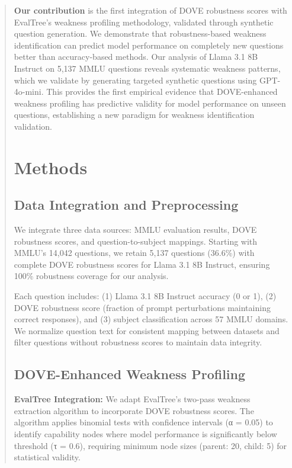 \documentclass[11pt]{article}
\begin{document}
\begin{abstract}
\textbf{Our contribution} is the first integration of DOVE robustness scores with EvalTree's weakness profiling methodology, validated through synthetic question generation. We demonstrate that robustness-based weakness identification can predict model performance on completely new questions better than accuracy-based methods. Our analysis of Llama 3.1 8B Instruct on 5,137 MMLU questions reveals systematic weakness patterns, which we validate by generating targeted synthetic questions using GPT-4o-mini. This provides the first empirical evidence that DOVE-enhanced weakness profiling has predictive validity for model performance on unseen questions, establishing a new paradigm for weakness identification validation.

\section{Methods}

\subsection{Data Integration and Preprocessing}

We integrate three data sources: MMLU evaluation results, DOVE robustness scores, and question-to-subject mappings. Starting with MMLU's 14,042 questions, we retain 5,137 questions (36.6\%) with complete DOVE robustness scores for Llama 3.1 8B Instruct, ensuring 100\% robustness coverage for our analysis.

Each question includes: (1) Llama 3.1 8B Instruct accuracy (0 or 1), (2) DOVE robustness score (fraction of prompt perturbations maintaining correct responses), and (3) subject classification across 57 MMLU domains. We normalize question text for consistent mapping between datasets and filter questions without robustness scores to maintain data integrity.

\subsection{DOVE-Enhanced Weakness Profiling}

\textbf{EvalTree Integration:} We adapt EvalTree's two-pass weakness extraction algorithm to incorporate DOVE robustness scores. The algorithm applies binomial tests with confidence intervals (α = 0.05) to identify capability nodes where model performance is significantly below threshold (τ = 0.6), requiring minimum node sizes (parent: 20, child: 5) for statistical validity.


\end{abstract}
\end{document}
